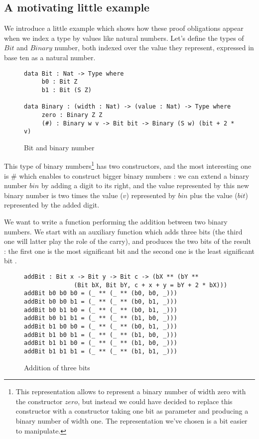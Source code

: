\subsection{A motivating little example}
We introduce a little example which shows how these proof obligations appear when we index a type by values like natural numbers.
Let's define the types of $Bit$ and $Binary$ number, both indexed over the value they represent, expressed in base ten as a natural number.
\begin{figure}[H]
\figrule
\begin{center}
\begin{lstlisting}
data Bit : Nat -> Type where
     b0 : Bit Z
     b1 : Bit (S Z)
     
data Binary : (width : Nat) -> (value : Nat) -> Type where
     zero : Binary Z Z
     (#) : Binary w v -> Bit bit -> Binary (S w) (bit + 2 * v)
\end{lstlisting}
\end{center}
\caption{Bit and binary number}
\figrule
\end{figure}

This type of binary numbers\footnote{This representation allows to represent a binary number of width zero with the constructor $zero$, but instead we could have decided to replace this constructor with a constructor taking one bit as parameter and producing a binary number of width one. The representation we've chosen is a bit easier to manipulate.}  has two constructors, and the most interesting one is $\#$ which enables to construct bigger binary numbers : we can extend a binary number $bin$ by adding a digit to its right, and the value represented by this new binary number is two times the value ($v$) represented by $bin$ plus the value ($bit$) represented by the added digit.

We want to write a function performing the addition between two binary numbers.
We start with an auxiliary function which adds three bits (the third one will latter play the role of the carry), and produces the two bits of the result : the first one is the most significant bit and the second one is the least significant bit .

\begin{figure}[H]
\figrule
\begin{center}
\begin{lstlisting}
addBit : Bit x -> Bit y -> Bit c -> (bX ** (bY ** 
              (Bit bX, Bit bY, c + x + y = bY + 2 * bX)))
addBit b0 b0 b0 = (_ ** (_ ** (b0, b0, _)))
addBit b0 b0 b1 = (_ ** (_ ** (b0, b1, _)))
addBit b0 b1 b0 = (_ ** (_ ** (b0, b1, _)))
addBit b0 b1 b1 = (_ ** (_ ** (b1, b0, _)))
addBit b1 b0 b0 = (_ ** (_ ** (b0, b1, _)))
addBit b1 b0 b1 = (_ ** (_ ** (b1, b0, _)))
addBit b1 b1 b0 = (_ ** (_ ** (b1, b0, _)))
addBit b1 b1 b1 = (_ ** (_ ** (b1, b1, _)))
\end{lstlisting}
\end{center}
\caption{Addition of three bits}
\figrule
\end{figure}

